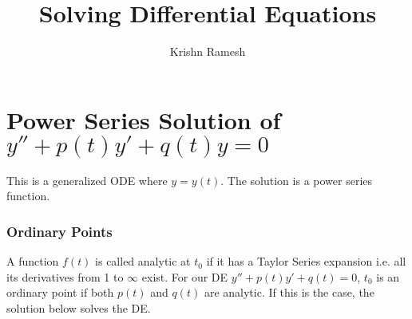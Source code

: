 \documentclass[11pt]{article}
\begin{document}
\title{Solving Differential Equations}
\author{Krishn Ramesh}
\maketitle



\section{Power Series Solution of $y''+p(t)y'+q(t)y=0$}

This is a generalized ODE where $y=y(t)$. The solution is a power series function.

\subsubsection*{Ordinary Points}
A function $f(t)$ is called analytic at $t_0$ if it has a Taylor Series expansion i.e. all its derivatives from 1 to $\infty$ exist. For our DE $y''+p(t)y' +q(t) = 0$, $t_0$ is an ordinary point if both $p(t)$ and $q(t)$ are analytic. If this is the case, the solution below solves the DE.
\end{document}
